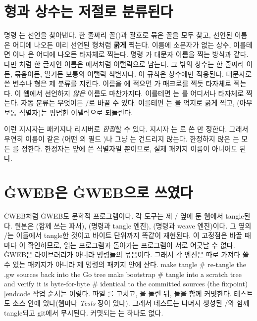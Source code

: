 \section{형과 상수는 저절로 분류된다}
명령 는  선언을 찾아낸다. 한 줄짜리 꼴()과 괄호로 묶은 꼴을 모두 찾고, 선언된 이름은 어디에 나오든 미리 선언된
형처럼 {\bf 굵게} 찍는다. 이름에 소문자가 없는 상수, 이를테면 이나
은 어디에 나오든 타자체로 찍는다. 명령 가 대문자 이름을
찍는 방식과 같다. 다만 처럼 한 글자인 이름은 에서처럼
이탤릭으로 남는다. 그 밖의 상수는 한 줄짜리 이든,
묶음이든,  열거든 보통의 이탤릭 식별자다. 이 규칙은 상수에만
적용된다. 대문자로 쓴 변수나 형은 제 분류를 지킨다. 이름을 에 적으면
가  매크로를 찍듯 타자체로 찍는다. 이 웹에서 선언하지
{\it 않은\/} 이름도 마찬가지다. 이를테면 는
를 어디서나 타자체로 찍는다. 자동 분류는 무엇이든
/로 바꿀 수 있다. 이를테면 는 을 억지로
굵게 찍고, (아무 보통 식별자)는 평범한 이탤릭으로 되돌린다.

이런 지시자는 패키지나 리시버로 {\it 한정\/}할 수 있다. 지시자
는 로 쓴 만 정한다. 그래서 우연히 이름이
같은 (어떤 의 필드 )나 그냥 는 건드리지
않는다. 한정하지 않은 는 모든 를 정한다. 한정자는
 앞에 쓴 식별자일 뿐이므로, 실제 패키지 이름이 아니어도 된다.

\section{\.{GWEB}은 \.{GWEB}으로 쓰였다}
\.{CWEB}처럼 \.{GWEB}도 문학적 프로그램이다. 각 도구는 제 \GO/ 옆에 둔
 웹에서 tangle된다. 원본은 (함께 쓰는 파서),
(명령과 tangle 엔진),
(명령과 weave 엔진)이다. 그 옆의 \GO/는 이들에서
tangle한 것이고 바이트 단위까지 똑같이 재현된다. 이 고정점은 바꿀 때마다
이 확인하므로, 읽는 프로그램과 돌아가는 프로그램이 서로
어긋날 수 없다. \.{GWEB}은 라이브러리가 아니라 명령들의 묶음이다. 그래서 각
엔진은 따로 가져다 쓸 수 있는 패키지가 아니라 제 명령의  패키지 안에
산다.
\begincode
make tangle       # re-tangle the .gw sources back into the Go tree
make bootstrap    # tangle into a scratch tree and verify it is byte-for-byte
                  # identical to the committed sources (the fixpoint)
|endcode
\noindent 작업 순서는 이렇다. 파일 를 고치고, 을 돌린 뒤,
둘을 함께 커밋한다. 테스트도  소스 안에 있다(웹마다 {\it Tests\/}
장이 있다). 그래서 테스트는 나머지 생성된 \GO/와 함께 tangle되고 git에서
무시된다. 커밋되는 는 하나도 없다.

